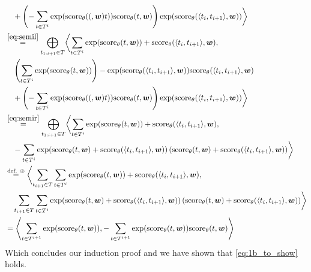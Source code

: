 \documentclass[a4paper,12pt]{ETHexercise}
\begin{document}
\begin{question}
\begin{subquestion}
\begin{align}
			 & \quad + \left( -\sum_{t \in T^{i}} \exp(\sscore(t)) \sscore{t} \right) \exp(\score{t_i}{t_{i+1}}) \biggr\rangle                                                     \\
			 & \overset{\cref{eq:semil}}{=} \bigoplus_{t_{1:i+1} \in T} \biggl\langle \sum_{t \in T^{i}} \exp(\sscore{t}) + \score{t_i}{t_{i+1}}, \nonumber                        \\
			 & \quad \left( \sum_{t \in T^{i}} \exp(\sscore{t}) \right) -\exp(\score{t_i}{t_{i+1}}) \score{t_i}{t_{i+1}} \nonumber                                                 \\
			 & \quad + \left( -\sum_{t \in T^{i}} \exp(\sscore(t)) \sscore{t} \right) \exp(\score{t_i}{t_{i+1}}) \biggr\rangle                                                     \\
			 & \overset{\cref{eq:semir}}{=} \bigoplus_{t_{1:i+1} \in T} \biggl\langle \sum_{t \in T^{i}} \exp(\sscore{t}) + \score{t_i}{t_{i+1}}, \nonumber                        \\
			 & \quad -\sum_{t \in T^{i}} \exp(\sscore{t} + \score{t_i}{t_{i+1}}) \left( \sscore{t} + \score{t_i}{t_{i+1}} \right) \biggr\rangle                                    \\
			 & \overset{\text{def. } \oplus}{=} \biggl\langle \sum_{t_{i+1} \in T} \sum_{t \in T^{i}} \exp(\sscore{t}) + \score{t_i}{t_{i+1}}, \nonumber                           \\
			 & \quad \sum_{t_{i+1} \in T} \sum_{t \in T^{i}} \exp(\sscore{t} + \score{t_i}{t_{i+1}}) \left( \sscore{t} + \score{t_i}{t_{i+1}} \right) \biggr\rangle                \\
			 & = \left\langle \sum_{t \in T^{i+1}} \exp(\sscore{t}), -\sum_{t \in T^{i+1}} \exp(\sscore{t}) \sscore{t} \right\rangle
		\end{align}
		Which concludes our induction proof and we have shown that \cref*{eq:1b_to_show} holds.

\end{subquestion}
\end{question}
\end{document}
